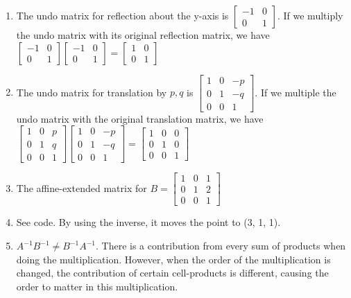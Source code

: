 \documentclass{article}
\begin{document}
\begin{enumerate}
	\item The undo matrix for reflection about the y-axis is $
	\begin{bmatrix}
		-1	&0\\
		0	&1
	\end{bmatrix}
	$. If we multiply the undo matrix with its original reflection matrix, we have $
	\begin{bmatrix}
		-1	&0\\
		0	&1
	\end{bmatrix}
	\begin{bmatrix}
		-1	&0\\
		0	&1		
	\end{bmatrix}
	= 
	\begin{bmatrix}
		1	&0\\
		0	&1		
	\end{bmatrix}
	$
	\item The undo matrix for translation by $p, q$ is $
	\begin{bmatrix}
		1	&0	&-p\\
		0	&1	&-q\\
		0	&0	&1
	\end{bmatrix}
	$. If we multiple the undo matrix with the original translation matrix, we have $
	\begin{bmatrix}
		1	&0	&p\\
		0	&1	&q\\
		0	&0	&1
	\end{bmatrix}	
	\begin{bmatrix}
		1	&0	&-p\\
		0	&1	&-q\\
		0	&0	&1
	\end{bmatrix}
	= 
	\begin{bmatrix}
		1	&0	&0\\
		0	&1	&0\\
		0	&0	&1
	\end{bmatrix}	
	$
	
	\item The affine-extended matrix for $B = 
	\begin{bmatrix}
		1	&0	&1\\
		0	&1	&2\\
		0	&0	&1
	\end{bmatrix}
	$
	\item See code. By using the inverse, it moves the point to (3, 1, 1). 
	
	\item $A^{-1}B^{-1} \neq B^{-1}A^{-1}$. There is a contribution from every sum of products when doing the multiplication. However, when the order of the multiplication is changed, the contribution of certain cell-products is different, causing the order to matter in this multiplication.
	

\end{enumerate}
\end{document}
